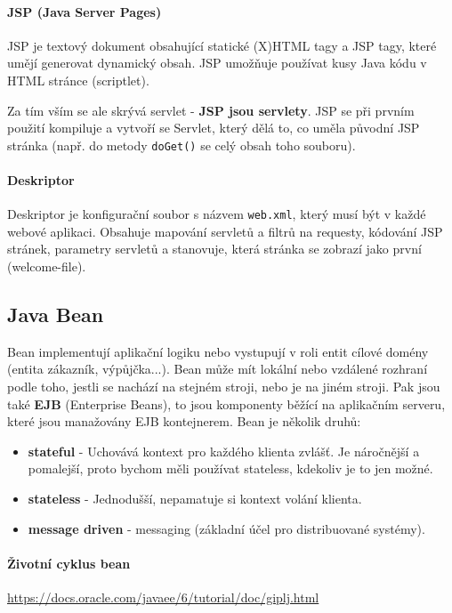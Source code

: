 \vspace{-20px}

\paragraph{JSP (Java Server Pages)}
JSP je textový dokument obsahující statické (X)HTML tagy a JSP tagy, které umějí generovat dynamický obsah. JSP umožňuje používat kusy Java kódu v HTML stránce (scriptlet).

Za tím vším se ale skrývá servlet - \textbf{JSP jsou servlety}. JSP se při prvním použití kompiluje a vytvoří se Servlet, který dělá to, co uměla původní JSP stránka (např. do metody \texttt{doGet()} se  celý obsah toho souboru).

\paragraph{Deskriptor} Deskriptor je konfigurační soubor s názvem \texttt{web.xml}, který musí být v každé webové aplikaci. Obsahuje mapování servletů a filtrů na requesty, kódování JSP stránek, parametry servletů a stanovuje, která stránka se zobrazí jako první (welcome-file).

\subsection{Java Bean}
Bean implementují aplikační logiku nebo vystupují v roli entit cílové domény (entita zákazník, výpůjčka...). Bean může mít lokální nebo vzdálené rozhraní podle toho, jestli se nachází na stejném stroji, nebo je na jiném stroji. Pak jsou také \textbf{EJB} (Enterprise Beans), to jsou komponenty běžící na aplikačním serveru, které jsou manažovány EJB kontejnerem. Bean je několik druhů:

\begin{itemize}[itemsep=0px]
\item \textbf{stateful} - Uchovává kontext pro každého klienta zvlášť. Je náročnější a pomalejší, proto bychom měli používat stateless, kdekoliv je to jen možné.
\item \textbf{stateless} - Jednodušší, nepamatuje si kontext volání klienta.
\item \textbf{message driven} - messaging (základní účel pro distribuované systémy).
\end{itemize}

\paragraph{Životní cyklus bean} \url{https://docs.oracle.com/javaee/6/tutorial/doc/giplj.html}

